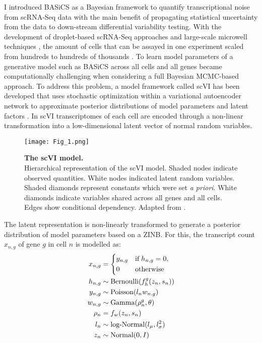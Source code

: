 I introduced BASiCS as a Bayesian framework to quantify transcriptional noise from scRNA-Seq data with the main benefit of propagating statistical uncertainty from the data to down-stream differential variability testing.
With the development of droplet-based scRNA-Seq approaches \citep{Macosko2015, Klein2015} and large-scale microwell techniques \citep{Han2018}, the amount of cells that can be assayed in one experiment scaled from hundreds to hundreds of thousands \citep{Svensson2018}. To learn model parameters of a generative model such as BASiCS across all cells and all genes became computationally challenging when considering a full Bayesian MCMC-based approach. To address this problem, a model framework called \gls{scVI} has been developed that uses stochastic optimization within a variational autoencoder network to approximate posterior distributions of model parameters and latent factors \citep{Lopez2018}. In scVI transcriptomes of each cell are encoded through a non-linear transformation into a low-dimensional latent vector of normal random variables. \\

\begin{wrapfigure}{r}{0.5\textwidth}
\centering    
\texttt{[image: Fig\_1.png]}
\caption[The scVI model.]{\textbf{The scVI model.} \\
Hierarchical representation of the scVI model. Shaded nodes indicate observed quantities. White nodes indicated latent random variables. Shaded diamonds represent constants which were set \emph{a priori}. White diamonds indicate variables shared across all genes and all cells. Edges show conditional dependency. Adapted from \citep{Lopez2018}.}
\label{fig0:scVI}
\vspace{-60mm}
\end{wrapfigure}

The latent representation is non-linearly transformed to generate a posterior distribution of model parameters based on a ZINB. For this, the transcript count $x_{n,g}$ of gene $g$ in cell $n$ is modelled as:\\

\begin{align*}
x_{n,g} & = 
 \left\lbrace
  \begin{aligned}
    & y_{n,g} && \textnormal{if} \; h_{n,g} = 0,  \\ 
    & 0 && \textnormal{otherwise}    	    
  \end{aligned}
\right.\\
h_{n,g} & \sim \textnormal{Bernoulli}(f_h^g(z_n,s_n))\\
y_{n,g} & \sim \textnormal{Poisson}(l_nw_{n.g})\\
w_{n,g} & \sim \textnormal{Gamma}(\rho^g_n, \theta)\\
\rho_n & = f_w(z_n,s_n)\\
l_n & \sim \textnormal{log-Normal}(l_{\mu},l^2_{\sigma})\\
z_n & \sim \textnormal{Normal}(0,I)
\end{align*}

